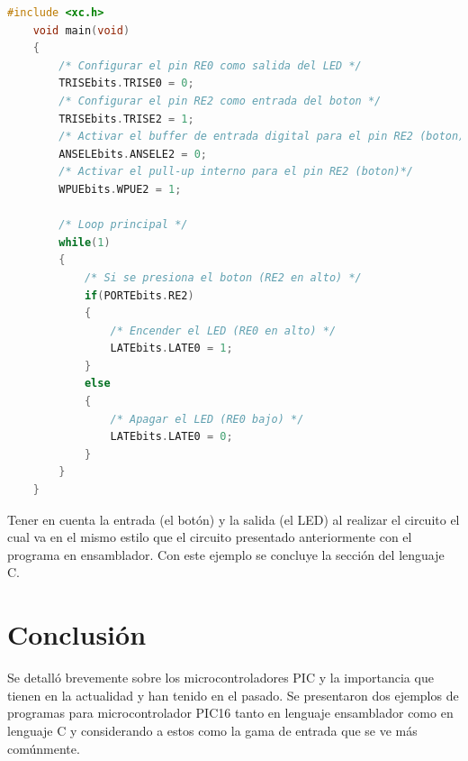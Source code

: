 \documentclass[conference]{IEEEtran}
\begin{document}
    \begin{lstlisting}[language=C, caption=Encender el LED al presionar el
    botón (con unión de bit)]
    #include <xc.h>
    void main(void)
    {
        /* Configurar el pin RE0 como salida del LED */
        TRISEbits.TRISE0 = 0;
        /* Configurar el pin RE2 como entrada del boton */
        TRISEbits.TRISE2 = 1;
        /* Activar el buffer de entrada digital para el pin RE2 (boton) */
        ANSELEbits.ANSELE2 = 0;
        /* Activar el pull-up interno para el pin RE2 (boton)*/
        WPUEbits.WPUE2 = 1;

        /* Loop principal */
        while(1)
        {
            /* Si se presiona el boton (RE2 en alto) */
            if(PORTEbits.RE2)
            {
                /* Encender el LED (RE0 en alto) */
                LATEbits.LATE0 = 1;
            }
            else
            {
                /* Apagar el LED (RE0 bajo) */
                LATEbits.LATE0 = 0;
            }
        }
    }
\end{lstlisting}

Tener en cuenta la entrada (el botón) y la salida (el LED) al realizar el
circuito el cual va en el mismo estilo que el circuito presentado
anteriormente con el programa en ensamblador. Con este ejemplo se concluye la
sección del lenguaje C.

\section{Conclusión}\label{sec:conclusion}

Se detalló brevemente sobre los microcontroladores PIC y la importancia que
tienen en la actualidad y han tenido en el pasado. Se presentaron dos
ejemplos de programas para microcontrolador PIC16 tanto en lenguaje
ensamblador como en lenguaje C y considerando a estos como la gama de entrada
que se ve más comúnmente.

\printbibliography
\end{document}
